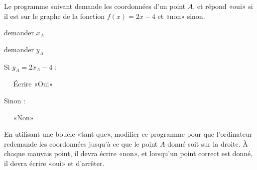 
\begin{exercice}\label{exosmath-0707}

    Le programme suivant demande les coordonnées d'un point \( A\), et répond «oui» si il est sur le graphe de la fonction \( f(x)=2x-4\) et «non» sinon.

    \begin{fmpage}{0.9\linewidth}

        demander \( x_A\)

        demander \( y_A\)

        Si \(  y_A=2x_A-4 \) :

        ~~ Écrire «Oui» 

        Sinon :

        ~~ «Non» 

    \end{fmpage}

    En utilisant une boucle «tant que», modifier ce programme pour que l'ordinateur redemande les coordonnées jusqu'à ce que le point \( A\) donné soit sur la droite. À chaque mauvais point, il devra écrire «non», et lorsqu'un point correct est donné, il devra écrire «oui» et d'arrêter.

\end{exercice}
